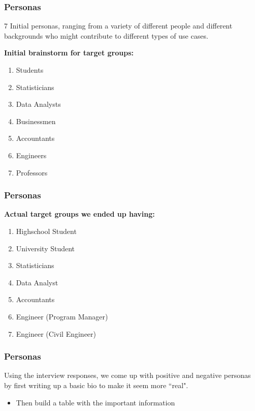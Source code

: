 \documentclass{beamer}
\begin{document}
\begin{frame}
    \frametitle{Personas}
    7 Initial personas, ranging from a variety of different people and different backgrounds who might 
    contribute to different types of use cases.

    \textbf{Initial brainstorm for target groups:}
    \begin{enumerate}
        \item Students
        \item Statisticians
        \item Data Analysts
        \item Businessmen
        \item Accountants
        \item Engineers
        \item Professors
    \end{enumerate}
    
\end{frame}

\begin{frame}
    \frametitle{Personas}

    \textbf{Actual target groups we ended up having:}
    \begin{enumerate}
        \item Highschool Student
        \item University Student
        \item Statisticians
        \item Data Analyst
        \item Accountants
        \item Engineer (Program Manager)
        \item Engineer (Civil Engineer)
    \end{enumerate}
    
\end{frame}

\begin{frame}
    \frametitle{Personas}
    Using the interview responses, we come up with positive and negative personas by first writing up
    a basic bio to make it seem more ``real".
    \begin{itemize}
        \item Then build a table with the important information
    \end{itemize}
\end{frame}
\end{document}
